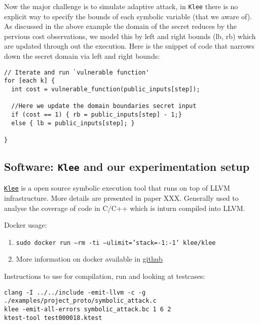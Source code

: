 \documentclass[11pt,a4paper,notitlepage]{article}
\begin{document}
Now the major challenge is to simulate adaptive attack, in \texttt{Klee} there is no explicit way to specify the bounds of each symbolic variable (that we aware of).
As discussed in the above example the domain of the secret reduces by the pervious cost observations, we model this by left and right bounds (lb, rb) which are updated through out the execution.
Here is the snippet of code that narrows down the secret domain via left and right bounds:
\begin{verbatim}
// Iterate and run `vulnerable function'
for [each k] {
  int cost = vulnerable_function(public_inputs[step]);

  //Here we update the domain boundaries secret input
  if (cost == 1) { rb = public_inputs[step] - 1;}
  else { lb = public_inputs[step]; }

}
\end{verbatim}

\subsection{Software: \texttt{Klee} and our experimentation setup}
\label{subsec:softwares}

\href{https://klee.github.io/}{\texttt{Klee}} is a open source symbolic execution tool that runs on top of LLVM infrastructure.
More details are presented in paper XXX.
Generally used to analyse the coverage of code in C/C++ which is inturn compiled into LLVM. 

Docker usage:
\begin{enumerate}
    \item \texttt{sudo docker run --rm -ti --ulimit='stack=-1:-1' klee/klee}
    \item More information on docker available in \href{http://klee.github.io/releases/docs/v1.3.0/docker/}{github}
\end{enumerate}

Instructions to use for compilation, run and looking at testcases:
\begin{verbatim}
clang -I ../../include -emit-llvm -c -g ./examples/project_proto/symbolic_attack.c
klee -emit-all-errors symbolic_attack.bc 1 6 2
ktest-tool test000018.ktest
\end{verbatim}
\end{document}

